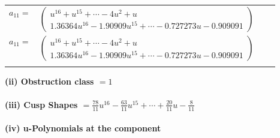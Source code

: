 \documentclass[1p]{elsarticle_modified}
\theoremstyle{definition}
\begin{document}
\begin{tabular}{m{7pt} m{180pt} m{7pt} m{180pt} }
\flushright $a_{11}=$&$\begin{pmatrix}u^{16}+u^{15}+\cdots-4 u^2+u\\1.36364 u^{16}-1.90909 u^{15}+\cdots-0.727273 u-0.909091\end{pmatrix}$\\ \flushright $a_{11}=$&$\begin{pmatrix}u^{16}+u^{15}+\cdots-4 u^2+u\\1.36364 u^{16}-1.90909 u^{15}+\cdots-0.727273 u-0.909091\end{pmatrix}$\\&\end{tabular}
\flushleft \textbf{(ii) Obstruction class $= 1$}\\~\\
\flushleft \textbf{(iii) Cusp Shapes $= \frac{78}{11} u^{16}-\frac{63}{11} u^{15}+\cdots+\frac{20}{11} u-\frac{8}{11}$}\\~\\
\newpage\renewcommand{\arraystretch}{1}
\flushleft \textbf{(iv) u-Polynomials at the component}\newline \\
\end{document}
